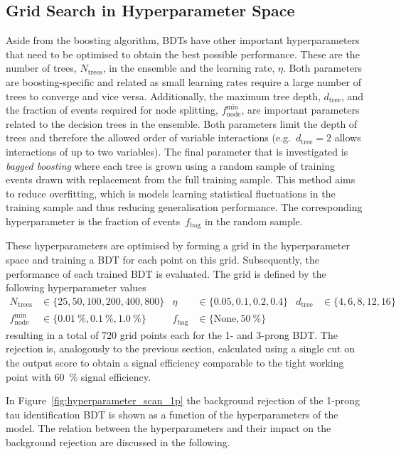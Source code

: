 \subsection{Grid Search in Hyperparameter Space}
\label{sec:bdt_grid_search}

Aside from the boosting algorithm, BDTs have other important hyperparameters
that need to be optimised to obtain the best possible performance. These are the
number of trees, $N_\text{trees}$, in the ensemble and the learning rate,
$\eta$. Both parameters are boosting-specific and related as small learning
rates require a large number of trees to converge and vice versa. Additionally,
the maximum tree depth, $d_\text{tree}$, and the fraction of events required for
node splitting, $f_\text{node}^\text{min}$, are important parameters related to
the decision trees in the ensemble. Both parameters limit the depth of trees and
therefore the allowed order of variable interactions (e.g.\ $d_\text{tree} = 2$
allows interactions of up to two variables). The final parameter that is
investigated is \emph{bagged boosting} where each tree is grown using a random
sample of training events drawn with replacement from the full training sample.
This method aims to reduce overfitting, which is models learning statistical
fluctuations in the training sample and thus reducing generalisation
performance. The corresponding hyperparameter is the fraction of
events~$f_\text{bag}$ in the random sample.

These hyperparameters are optimised by forming a grid in the hyperparameter
space and training a BDT for each point on this grid. Subsequently, the
performance of each trained BDT is evaluated. The grid is defined by the
following hyperparameter values
\begin{align*}
  N_\mathrm{trees} &\in \{25, 50, 100, 200, 400, 800\} & \eta &\in \{0.05, 0.1, 0.2, 0.4\} & d_\mathrm{tree} &\in \{4, 6, 8, 12, 16\}\\
  f_\mathrm{node}^\mathrm{min} &\in \{\SI{0.01}{\percent}, \SI{0.1}{\percent},\SI{1.0}{\percent}\} & f_\text{bag} &\in \{\text{None}, \SI{50}{\percent} \}
\end{align*}
resulting in a total of 720 grid points each for the 1- and 3-prong BDT. The
rejection is, analogously to the previous section, calculated using a single cut
on the output score to obtain a signal efficiency comparable to the tight
working point with \SI{60}{\percent} signal efficiency.

In Figure~\ref{fig:hyperparameter_scan_1p} the background rejection of the
1-prong tau identification BDT is shown as a function of the hyperparameters of
the model. The relation between the hyperparameters and their impact on the
background rejection are discussed in the following.

